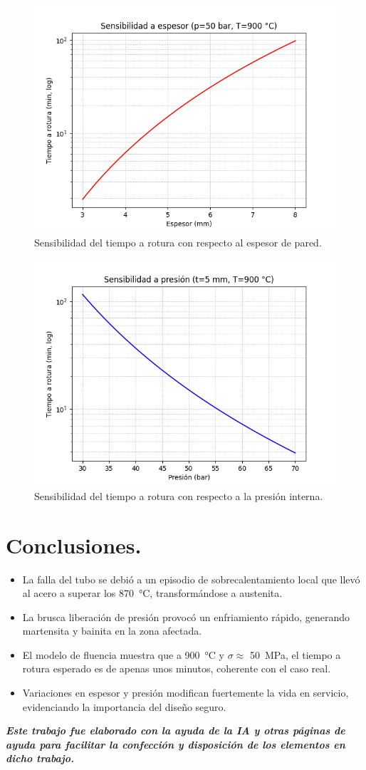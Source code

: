 \documentclass[12pt,a4paper]{article}
\begin{document}
\begin{figure}[H]
    \centering
    \includegraphics[width=0.7\linewidth]{Figuras/sens_espesor.png}
    \caption{Sensibilidad del tiempo a rotura con respecto al espesor de pared.}
\end{figure}

\begin{figure}[H]
    \centering
    \includegraphics[width=0.7\linewidth]{Figuras/sens_presion.png}
    \caption{Sensibilidad del tiempo a rotura con respecto a la presión interna.}
\end{figure}

\section{Conclusiones.}
\begin{itemize}
    \item La falla del tubo se debió a un episodio de sobrecalentamiento local que llevó al acero a superar los \SI{870}{\celsius}, transformándose a austenita.
    \item La brusca liberación de presión provocó un enfriamiento rápido, generando martensita y bainita en la zona afectada.
    \item El modelo de fluencia muestra que a \SI{900}{\celsius} y $\sigma \approx$ \SI{50}{\mega\pascal}, el tiempo a rotura esperado es de apenas unos minutos, coherente con el caso real.
    \item Variaciones en espesor y presión modifican fuertemente la vida en servicio, evidenciando la importancia del diseño seguro.
\end{itemize}

\vfill
\textit{\textbf{Este trabajo fue elaborado con la ayuda de la IA y otras páginas de ayuda para facilitar la confección y disposición de los elementos en dicho trabajo.}}
\end{document}
